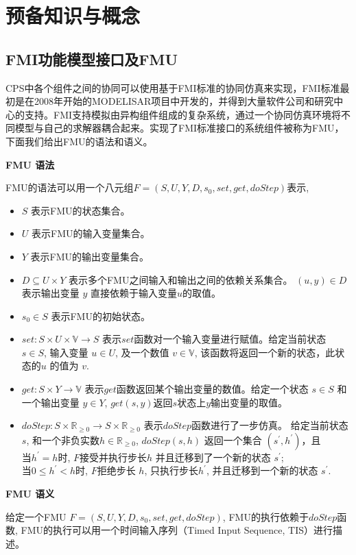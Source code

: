 \chapter{预备知识与概念}
\label{ch2}
\section{FMI功能模型接口及FMU}
CPS中各个组件之间的协同可以使用基于FMI标准的协同仿真来实现，FMI标准最初是在2008年开始的MODELISAR项目中开发的，并得到大量软件公司和研究中心的支持。FMI支持模拟由异构组件组成的复杂系统，通过一个协同仿真环境将不同模型与自己的求解器耦合起来。实现了FMI标准接口的系统组件被称为FMU，下面我们给出FMU的语法和语义。
\begin{define}
\textbf{FMU 语法}

FMU的语法可以用一个八元组$F=(S,U,Y,D,s_{0},set,get,doStep)$表示, 
\end{define}
\begin{itemize}
\item
$S$ 表示FMU的状态集合。
\item
$U$ 表示FMU的输入变量集合。
\item
$Y$ 表示FMU的输出变量集合。
\item
$D \subseteq U \times Y$ 表示多个FMU之间输入和输出之间的依赖关系集合。 $(u,y) \in D $表示输出变量 $y$ 直接依赖于输入变量$u$的取值。 
\item
$s_{0} \in S$ 表示FMU的初始状态。
\item
$set : S \times U \times \mathbb{V} \rightarrow S$ 表示$set$函数对一个输入变量进行赋值。给定当前状态 $s \in S$, 输入变量 $u \in U$, 及一个数值 $v \in \mathbb{V}$, 该函数将返回一个新的状态，此状态的$u$ 的值为 $v$.
\item
$get : S \times Y \rightarrow \mathbb{V}$ 表示$get$函数返回某个输出变量的数值。给定一个状态 $s \in S$ 和一个输出变量 $y \in Y$, $get(s,y)$返回$s$状态上$y$输出变量的取值。
\item
$doStep : S \times \mathbb{R}_{\geqslant{0}} \rightarrow S \times \mathbb{R}_{\geqslant{0}}$ 表示$doStep$函数进行了一步仿真。 给定当前状态 $s$, 和一个非负实数$h \in \mathbb{R}_{\geqslant{0}}$, $doStep(s,h)$ 返回一个集合 $(s^{\prime},h^{\prime})$，且
\\
    当$h^{\prime} = h$时, $F$接受并执行步长$h$ 并且迁移到了一个新的状态 $s^{\prime}$;
\\
    当$0 \leqslant h^{\prime} < h$时, $F$拒绝步长 $h$, 只执行步长$h^{\prime}$, 并且迁移到一个新的状态 $s^{\prime}$.
\end{itemize}
\begin{define}
\textbf{FMU 语义}
\end{define} 
给定一个FMU $F=(S,U,Y,D,s_{0},set,get,doStep)$, FMU的执行依赖于$doStep$函数, FMU的执行可以用一个时间输入序列（Timed Input Sequence, TIS）进行描述。

